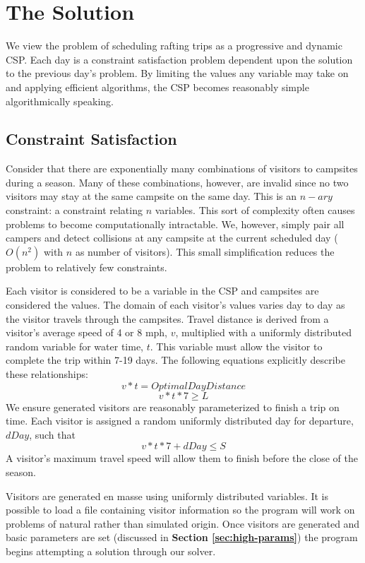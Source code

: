 \documentclass[11pt]{article} %
\begin{document}
\section{The Solution}
\label{sec:model-details}
We view the problem of scheduling rafting trips as a progressive and dynamic
CSP. 
Each day is a constraint satisfaction problem dependent upon the
solution to the previous day's problem.  By limiting the values any variable
may take on and applying efficient algorithms, the CSP becomes 
reasonably simple algorithmically speaking.

\subsection{Constraint Satisfaction}
\label{sec:csp}

Consider that there are exponentially
many combinations of  visitors to campsites during a season.  Many of
these combinations, however, are invalid since no two
 visitors may stay at the same campsite on the same day.
This is an $n-ary$ constraint: a constraint relating $n$ variables.  This sort 
of complexity often causes problems to become computationally intractable.  We, 
however, simply pair all campers and detect collisions at any campsite at the 
current scheduled day
($O(n^2)$ with $n$ as number of  visitors).  This small simplification reduces 
the problem to relatively few constraints.

Each visitor is considered to be a variable
in the CSP and campsites are considered the values.  The domain of
each visitor's values varies day to day as the visitor travels through the
campsites.  Travel distance is derived from
a visitor's average speed of 4 or 8 mph, $v$,  multiplied with a uniformly distributed
random variable for water time, $t$.  This variable must allow the visitor to complete the trip
within 7-19 days. The following equations explicitly
describe these relationships:
$$v*t=OptimalDayDistance$$
$$v*t*7\geq L$$
We ensure generated visitors are reasonably
parameterized to finish a trip on time.  Each visitor is assigned a random
uniformly distributed day for departure, $dDay$, such that
$$v*t*7+dDay\leq S$$
A visitor's maximum travel speed will allow them to finish before
the close of the season.

Visitors are generated en masse using uniformly distributed
variables.  It is possible to load a file containing visitor information
so the program will work on problems of natural rather than simulated
origin.  Once visitors are generated and basic parameters
are set (discussed in \textbf{Section \ref{sec:high-params}}) the program begins
attempting a solution through our solver.
\end{document}

